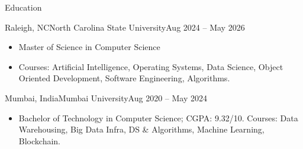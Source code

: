 \documentclass[]{mcdowellcv}
\begin{document}
\begin{cvsection}{Education}
  \begin{cvsubsection}{Raleigh, NC}{North Carolina State University}{Aug 2024 -- May 2026}
    \begin{itemize}
      \item Master of Science in Computer Science
      \item Courses: Artificial Intelligence, Operating Systems, Data Science, Object Oriented Development, Software Engineering, Algorithms.
    \end{itemize}
    \vspace{-1.5pt}
  \end{cvsubsection}

  \begin{cvsubsection}{Mumbai, India}{Mumbai University}{Aug 2020 -- May 2024}
    \begin{itemize}
      \item Bachelor of Technology in Computer Science; CGPA: 9.32/10. Courses: Data Warehousing, Big Data Infra, DS \& Algorithms, Machine Learning, Blockchain.
    \end{itemize}
    \vspace{-1.5pt}
  \end{cvsubsection}
\end{cvsection}
\end{document}
